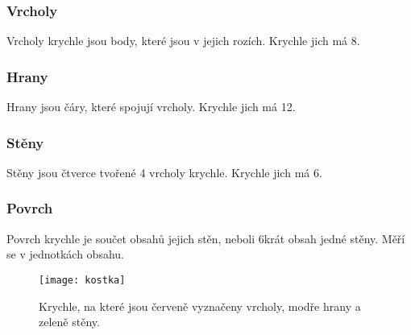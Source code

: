 \subsubsection{Vrcholy}
Vrcholy krychle jsou body, které jsou v jejich rozích. Krychle jich má 8.

\subsubsection{Hrany}
Hrany jsou čáry, které spojují vrcholy. Krychle jich má 12.

\subsubsection{Stěny}
Stěny jsou čtverce tvořené 4 vrcholy krychle. Krychle jich má 6.

\subsubsection{Povrch}
Povrch krychle je součet obsahů jejich stěn, neboli 6krát obsah jedné stěny. Měří se v jednotkách obsahu.

\begin{figure}[h]
    \caption{Krychle, na které jsou červeně vyznačeny vrcholy, modře hrany a zeleně stěny.}
    \centering
    \texttt{[image: kostka]}
\end{figure}


